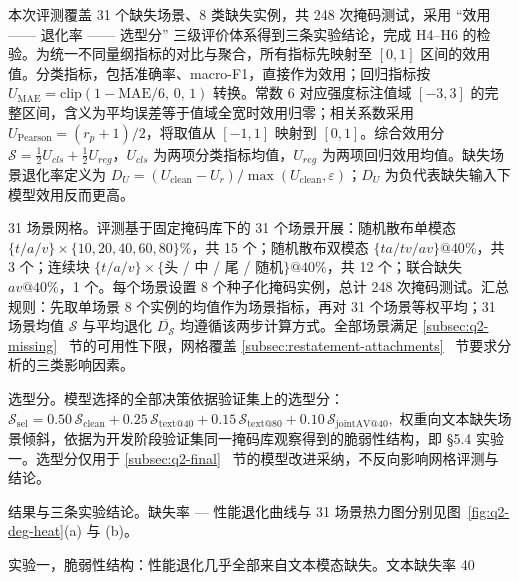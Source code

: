 \documentclass[colorprint,nocoverzero]{gmcmthesis}
\begin{document}
本次评测覆盖 31 个缺失场景、8 类缺失实例，共 248 次掩码测试，采用 “效用 —— 退化率 —— 选型分” 三级评价体系得到三条实验结论，完成 H4–H6 的检验。为统一不同量纲指标的对比与聚合，所有指标先映射至 \([0,1]\) 区间的效用值。分类指标，包括准确率、macro-F1，直接作为效用；回归指标按 \(U_{\mathrm{MAE}}=\mathrm{clip}(1-\mathrm{MAE}/6,\,0,\,1)\) 转换。常数 6 对应强度标注值域 \([-3,3]\) 的完整区间，含义为平均误差等于值域全宽时效用归零；相关系数采用 \(U_{\mathrm{Pearson}}=(r_p+1)/2\)，将取值从 \([-1,1]\) 映射到 \([0,1]\)。综合效用分 \(\mathcal{S}=\tfrac12 U_{cls}+\tfrac12 U_{reg}\)，\(U_{cls}\) 为两项分类指标均值，\(U_{reg}\) 为两项回归效用均值。缺失场景退化率定义为 \(D_U=(U_{\mathrm{clean}}-U_r)/\max(U_{\mathrm{clean}},\varepsilon)\)；\(D_U\) 为负代表缺失输入下模型效用反而更高。

31 场景网格。评测基于固定掩码库下的 31 个场景开展：随机散布单模态 \(\{t/a/v\}\times\{10,20,40,60,80\}\%\)，共 15 个；随机散布双模态 \(\{ta/tv/av\}@40\%\)，共 3 个；连续块 \(\{t/a/v\}\times\{\)头 / 中 / 尾 / 随机\(\}@40\%\)，共 12 个；联合缺失 \(av@40\%\)，1 个。每个场景设置 8 个种子化掩码实例，总计 248 次掩码测试。汇总规则：先取单场景 8 个实例的均值作为场景指标，再对 31 个场景等权平均；31 场景均值 \(\mathcal{S}\) 与平均退化 \(\overline{D_{\mathcal{S}}}\) 均遵循该两步计算方式。全部场景满足 \ref{subsec:q2-missing}~ 节的可用性下限，网格覆盖 \ref{subsec:restatement-attachments}~ 节要求分析的三类影响因素。

选型分。模型选择的全部决策依据验证集上的选型分：
\(\mathcal{S}_{\mathrm{sel}}=0.50\,\mathcal{S}_{\mathrm{clean}}+0.25\,\mathcal{S}_{\text{text}@40}+0.15\,\mathcal{S}_{\text{text}@80}+0.10\,\mathcal{S}_{\text{jointAV}@40},\)
权重向文本缺失场景倾斜，依据为开发阶段验证集同一掩码库观察得到的脆弱性结构，即 §5.4 实验一。选型分仅用于 \ref{subsec:q2-final}~ 节的模型改进采纳，不反向影响网格评测与结论。

结果与三条实验结论。缺失率 — 性能退化曲线与 31 场景热力图分别见图~\ref{fig:q2-deg-heat}(a) 与 (b)。

实验一，脆弱性结构：性能退化几乎全部来自文本模态缺失。文本缺失率 40%
\end{document}
